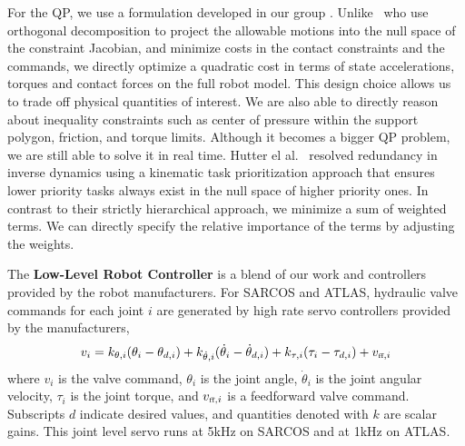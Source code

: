 \documentclass[letterpaper,12pt,fullpage]{article}
\newcommand{\ff}{{\mbox {\tiny ff}}}
\begin{document}
For the QP, we use a formulation developed in our group 
\cite{Stephens-thesis,Whitman10,Whitman-thesis}. Unlike~\cite{mistry10,usc_id1} who 
use orthogonal decomposition to project the allowable motions into the null 
space of the constraint Jacobian, and minimize costs in the contact constraints and the commands, we directly 
optimize a quadratic cost in terms of state accelerations, torques and contact 
forces on the full robot model. This design choice allows us to trade off physical quantities of 
interest. We are also able to directly reason about inequality constraints 
such as center of pressure within the support polygon, friction, and torque 
limits. Although it becomes a bigger QP problem, we are still able to solve it 
in real time. Hutter el al.~\cite{eth_id} resolved redundancy in inverse 
dynamics using a kinematic task prioritization approach that ensures lower 
priority tasks always exist in the null space of higher priority ones. In 
contrast to their strictly hierarchical approach, we minimize a sum of 
weighted terms. 
We can directly specify the relative importance of the terms by adjusting 
the weights. 




The {\bf Low-Level Robot Controller} is a blend of our work and controllers
provided by the robot manufacturers. For SARCOS
and ATLAS, hydraulic valve commands for each
joint $i$ are generated by high rate servo controllers provided
by the manufacturers,
\begin{equation}
v_i = k_{\theta,i} ( \theta_i - \theta_{d,i} )
+ k_{\dot{\theta},i} ( \dot{\theta}_i - \dot{\theta}_{d,i} )
+ k_{\tau,i} ( \tau_i - \tau_{d,i} )
+ v_{\ff,i}
\end{equation}
where $v_i$ is the valve command,
$\theta_i$ is the joint angle,
$\dot{\theta}_i$ is the joint angular velocity,
$\tau_i$ is the joint torque,
and $v_{\ff,i}$ is a feedforward valve command.
Subscripts $d$ indicate desired values, and
quantities denoted with $k$ are scalar gains.
This joint level servo runs at 5kHz on SARCOS and at
1kHz on ATLAS.
\end{document}
